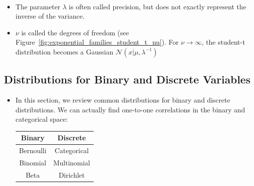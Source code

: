 \begin{itemize}
\begin{equation*}
\begin{split}
		\end{split}
	\end{equation*}
	\item The parameter $\lambda$ is often called precision, but does not exactly represent the inverse of the variance.
	\item $\nu$ is called the degrees of freedom (see Figure~\ref{fig:exponential_families_student_t_nu}). For $\nu\to\infty$, the student-t distribution becomes a Gaussian $\mathcal{N}(x\vert\mu, \lambda^{-1})$
\end{itemize}
\subsection{Distributions for Binary and Discrete Variables}
\begin{itemize}
	\item In this section, we review common distributions for binary and discrete distributions. We can actually find one-to-one correlations in the binary and categorical space:
	\begin{table}[ht!]
		\centering
		\begin{tabular}{c|c}
			Binary & Discrete\\\hline
			Bernoulli & Categorical\\
			Binomial & Multinomial\\
			Beta & Dirichlet
		\end{tabular}
		\vspace{-5mm}
	\end{table}
\end{itemize}
